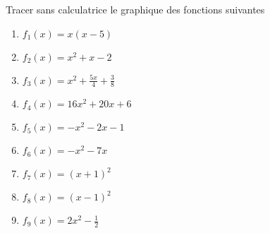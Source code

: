
\begin{exercice}\label{exoPremiere-0040}

    Tracer sans calculatrice le graphique des fonctions suivantes
    \begin{multicols}{3}
        \begin{enumerate}
            \item
                $f_1(x)=x(x-5)$
            \item
                \( f_2(x)=x^2+x-2\)
            \item
                \( f_3(x)=x^2+\frac{ 5x }{ 4 }+\frac{ 3 }{ 8 }\)
            \item
                \( f_4(x)=16x^2+20x+6\)
            \item
                \( f_5(x)=-x^2-2x-1\)
            \item
                \( f_6(x)=-x^2-7x\)
            \item
                \( f_7(x)=(x+1)^2\)
            \item
                \( f_8(x)=(x-1)^2\)
            \item
                \( f_9(x)=2x^2-\frac{ 1 }{2}\)
        \end{enumerate}
    \end{multicols}

\end{exercice}
